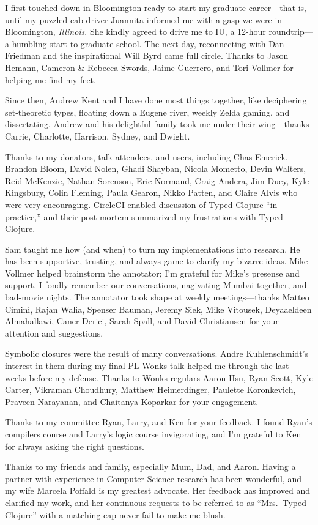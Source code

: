 I first touched down in Bloomington ready to start my graduate career---that is, until 
my puzzled cab driver Juannita informed me with a gasp
we were in Bloomington, \emph{Illinois}.
She kindly agreed to drive me to IU, a 12-hour roundtrip---a humbling start to graduate school.
The next day, reconnecting with Dan Friedman and the inspirational Will Byrd came full circle.
Thanks to Jason Hemann, Cameron \& Rebecca Swords, Jaime Guerrero, 
and Tori Vollmer for helping me find my feet.

Since then, Andrew Kent and I have done most things together, like deciphering 
set-theoretic types, floating down a Eugene river,
weekly Zelda gaming, and dissertating.
Andrew and his delightful family took me under their wing---thanks
Carrie, Charlotte, Harrison, Sydney, and Dwight.

Thanks to my donators, talk attendees, and users, including
Chas Emerick, Brandon Bloom, David Nolen,
Ghadi Shayban, Nicola Mometto, Devin Walters, Reid McKenzie, Nathan Sorenson, Eric
Normand, Craig Andera, Jim Duey, Kyle Kingsbury, Colin Fleming, Paula Gearon,
Nikko Patten, and Claire Alvis who were very encouraging.
CircleCI enabled discussion of Typed Clojure ``in practice,'' and their post-mortem
summarized my frustrations with Typed Clojure.

Sam taught me how (and when) to turn my implementations into research.
He has been supportive, trusting, and always game to clarify my bizarre ideas.
Mike Vollmer helped brainstorm the annotator;
I'm grateful for Mike's presense and support. I fondly remember our
conversations, nagivating Mumbai together, and bad-movie nights.
The annotator took shape at weekly meetings---thanks
Matteo Cimini, Rajan Walia, Spenser Bauman, Jeremy Siek, Mike Vitousek, Deyaaeldeen Almahallawi,
Caner Derici, Sarah Spall, and David Christiansen for your attention and suggestions.

Symbolic closures were the result of many conversations.
Andre Kuhlenschmidt's interest in them during my final PL Wonks talk
helped me through the last weeks before my defense.
Thanks to Wonks regulars Aaron Hsu, 
Ryan Scott, Kyle Carter, 
Vikraman Choudhury, Matthew Heimerdinger, Paulette Koronkevich, Praveen Narayanan,
and Chaitanya Koparkar for your engagement.

Thanks to my committee Ryan, Larry, and Ken for your feedback.
I found Ryan's compilers course and Larry's logic course invigorating,
and I'm grateful to Ken for always asking the right questions.

Thanks to my friends and family, especially Mum, Dad, and Aaron.
Having a partner with experience in Computer Science research has been wonderful, 
and my wife Marcela Poffald is my greatest advocate.
Her feedback has improved and clarified my work,
and her continuous requests
to be referred to as ``Mrs.~Typed Clojure'' with a matching cap never
fail to make me blush.
